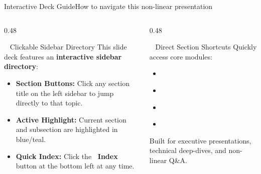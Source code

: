 \documentclass[aspectratio=169, 10pt]{beamer}
\newenvironment{compactitemize}{%
  \begin{itemize}%
    \setlength{\itemsep}{1pt}%
    \setlength{\parskip}{0pt}%
    \setlength{\parsep}{0pt}%
}{%
  \end{itemize}%
}
\begin{document}
\begin{frame}{Interactive Deck Guide}{How to navigate this non-linear presentation}
  \begin{columns}[T]
    \begin{column}{0.48\textwidth}
      \begin{featurebox}{\faHandPointer~ Clickable Sidebar Directory}
        \small
        This slide deck features an \textbf{interactive sidebar directory}:
        \begin{compactitemize}
          \item \textbf{Section Buttons:} Click any section title on the left sidebar to jump directly to that topic.
          \item \textbf{Active Highlight:} Current section and subsection are highlighted in blue/teal.
          \item \textbf{Quick Index:} Click the \textbf{\faCompass~Index} button at the bottom left at any time.
        \end{compactitemize}
      \end{featurebox}
    \end{column}
    
    \begin{column}{0.48\textwidth}
      \begin{featurebox}{\faBookmark~ Direct Section Shortcuts}
        \small
        Quickly access core modules:
        \vspace*{2pt}
        \begin{compactitemize}
          \item \hyperlink{sec:vision}{}
          \item \hyperlink{sec:architecture}{}
          \item \hyperlink{sec:deployment}{}
          \item \hyperlink{sec:appendix}{}
        \end{compactitemize}
        \vspace*{2pt}
        {\tiny\color{TextMuted} Built for executive presentations, technical deep-dives, and non-linear Q\&A.}
      \end{featurebox}
    \end{column}
  \end{columns}
\end{frame}
\end{document}
